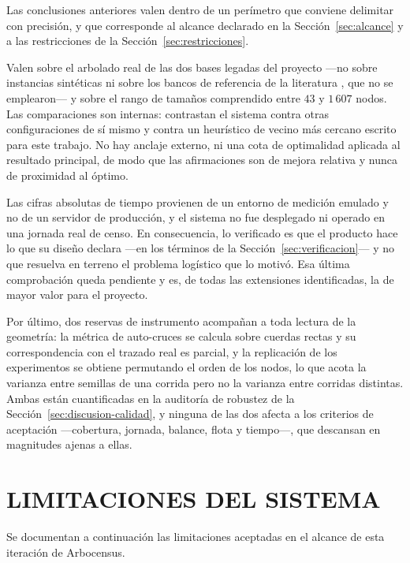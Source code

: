 Las conclusiones anteriores valen dentro de un perímetro que conviene delimitar con
precisión, y que corresponde al alcance declarado en la Sección~\ref{sec:alcance} y a
las restricciones de la Sección~\ref{sec:restricciones}.

Valen sobre el arbolado real de las dos bases legadas del proyecto ---no sobre
instancias sintéticas ni sobre los bancos de referencia de la literatura
\citep{solomon1987algorithms}, que no se emplearon--- y sobre el rango de tamaños comprendido entre $43$ y $1\,607$ nodos. Las
comparaciones son internas: contrastan el sistema contra otras configuraciones de sí
mismo y contra un heurístico de vecino más cercano escrito para este trabajo. No hay
anclaje externo, ni una cota de optimalidad aplicada al resultado principal, de modo
que las afirmaciones son de mejora relativa y nunca de proximidad al óptimo.

Las cifras absolutas de tiempo provienen de un entorno de medición emulado y no de un
servidor de producción, y el sistema no fue desplegado ni operado en una jornada real
de censo. En consecuencia, lo verificado es que el producto hace lo que su diseño
declara ---en los términos de la Sección~\ref{sec:verificacion}--- y no que resuelva
en terreno el problema logístico que lo motivó. Esa última comprobación queda
pendiente y es, de todas las extensiones identificadas, la de mayor valor para el
proyecto.

Por último, dos reservas de instrumento acompañan a toda lectura de la geometría: la
métrica de auto-cruces se calcula sobre cuerdas rectas y su correspondencia con el
trazado real es parcial, y la replicación de los experimentos se obtiene permutando el
orden de los nodos, lo que acota la varianza entre semillas de una corrida pero no la
varianza entre corridas distintas. Ambas están cuantificadas en la auditoría de
robustez de la Sección~\ref{sec:discusion-calidad}, y ninguna de las dos afecta a los
criterios de aceptación ---cobertura, jornada, balance, flota y tiempo---, que
descansan en magnitudes ajenas a ellas.

\section{LIMITACIONES DEL SISTEMA}
\label{sec:limitaciones}

Se documentan a continuación las limitaciones aceptadas en el alcance de esta
iteración de Arbocensus.

